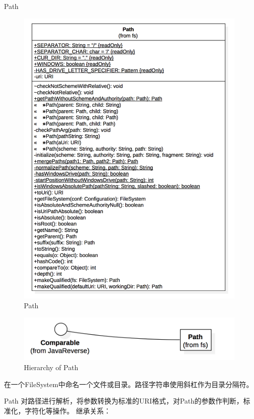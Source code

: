 Path

\begin{figure}
\centering
\includegraphics[width =1\linewidth]{6.png}
\caption{Path}
\label{fig:Path}
\end{figure}

\begin{figure}[h]
\centering
\includegraphics[width =1\linewidth]{7.png}
\caption{Hierarchy of Path}
\label{fig:Hierarchy of Path}
\end{figure}

在一个FileSystem中命名一个文件或目录。路径字符串使用斜杠作为目录分隔符。

Path 对路径进行解析，将参数转换为标准的URI格式，对Path的参数作判断，标准化，字符化等操作。
继承关系：

